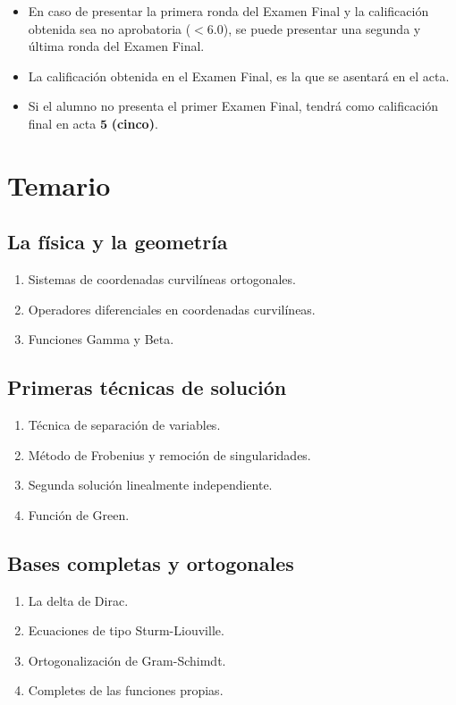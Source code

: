 \begin{itemize}
\setlength{\itemsep}{0mm}
\item En caso de presentar la primera ronda del Examen Final y la calificación obtenida sea no aprobatoria ($<6.0$), se puede presentar una segunda y última ronda del Examen Final.
\item La calificación obtenida en el Examen Final, es la que se asentará en el acta.
\item Si el alumno no presenta el primer Examen Final, tendrá como calificación final en acta $\mathbf{5}$ \textbf{(cinco)}. 
\end{itemize}

\section{Temario}

\subsection{La física y la geometría}

\begin{enumerate}
\item Sistemas de coordenadas curvilíneas ortogonales.
\item Operadores diferenciales en coordenadas curvilíneas.
\item Funciones Gamma y Beta.
\end{enumerate}

\subsection{Primeras técnicas de solución}

\begin{enumerate}
\item Técnica de separación de variables.
\item Método de Frobenius y remoción de singularidades.
\item Segunda solución linealmente independiente.
\item Función de Green.
\end{enumerate}

\subsection{Bases completas y ortogonales}

\begin{enumerate}
\item La delta de Dirac. 
\item Ecuaciones de tipo Sturm-Liouville.
\item Ortogonalización de Gram-Schimdt.
\item Completes de las funciones propias.
\end{enumerate}

